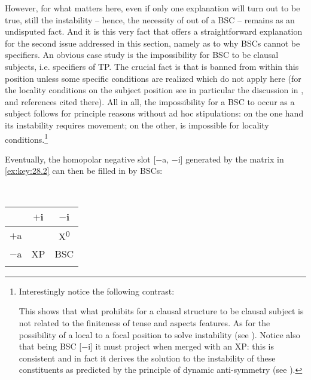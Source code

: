 \documentclass[output=paper]{langsci/langscibook}
\begin{document}
However, for what matters here, even if only one explanation will turn out to
be true, still the instability – hence, the necessity of  out of a \gls{BSC}
– remains as an undisputed fact. And it is this very fact that offers a
straightforward explanation for the second issue addressed in this section,
namely as to why \glspl{BSC} cannot be specifiers. An obvious case study is the
impossibility for \gls{BSC} to be clausal subjects, i.e. specifiers of TP.  The
crucial fact is that  is banned from within this position unless some
specific conditions are realized which do not apply here (for the locality
conditions on the subject position see in particular the discussion in
\citealt{Rizzi2015}, \citealt{Stepanov2007} and references cited there). All
in all, the impossibility for a \gls{BSC} to occur as a subject follows for principle
reasons without ad hoc stipulations: on the one hand its instability requires
movement; on the other,  is impossible for locality
conditions.\footnote{Interestingly notice the following contrast:

\begin{exe}
    \begin{xlist}
    \end{xlist}
\end{exe}

This shows that what prohibits for a clausal structure to be clausal subject is
not related to the finiteness of tense and aspects features. As for the
possibility of a local  to a focal position to solve instability (see
\citealt{Moro2009}). Notice also that being \gls{BSC} [$-$i] it must project when merged
with an XP\@: this is consistent and in fact it derives the solution to the
instability of these constituents as predicted by the principle of dynamic
anti-symmetry (see
\citealt{Moro2000,Moro2009,Chomsky2013,Chomsky2017,ChoGalOtt2019,Rizzi2015,Rizzi2016}).}

Eventually, the homopolar negative slot [$-$a, $-$i] generated by the matrix in
\eqref{ex:key:28.2} can then be filled in by \glspl{BSC}:

\ea\label{ex:key:28.4}\leavevmode\\[-1\baselineskip]
    \begin{tabular}{ccc}
    \lsptoprule
                & $+$i & $-$i\\
    \midrule
    $+$a &             & X\textsuperscript{0}\\
    $-$a & XP          & BSC\\
    \lspbottomrule
    \end{tabular}
\z
\end{document}
